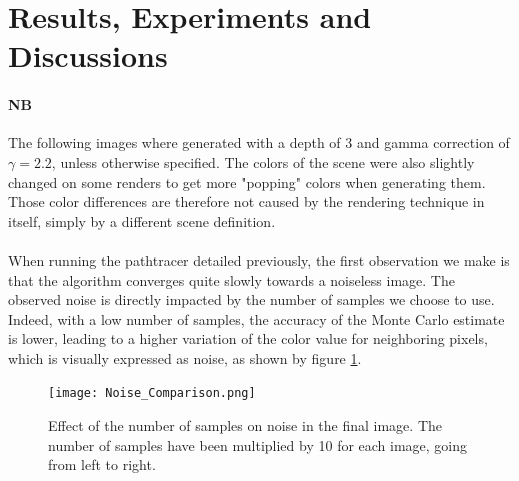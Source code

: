 \documentclass[12pt, oneside]{report}
\begin{document}
\section*{Results, Experiments and Discussions}

\paragraph{NB} The following images where generated with a depth of 3 and gamma correction of $\gamma = 2.2$, unless otherwise specified. The colors of the scene were also slightly changed on some renders to get more "popping" colors when generating them. Those color differences are therefore not caused by the rendering technique in itself, simply by a different scene definition.

\paragraph{}When running the pathtracer detailed previously, the first observation we make is that the algorithm converges quite slowly towards a noiseless image. The observed noise is directly impacted by the number of samples we choose to use. Indeed, with a low number of samples, the accuracy of the Monte Carlo estimate is lower, leading to a higher variation of the color value for neighboring pixels, which is visually expressed as noise, as shown by figure \ref{fig:noiseComparison}.

\begin{figure}[h]
    \centering
    \texttt{[image: Noise\_Comparison.png]} 
    \caption{Effect of the number of samples on noise in the final image. The number of samples have been multiplied by 10 for each image, going from left to right.}
    \label{fig:noiseComparison}
\end{figure}
\end{document}

